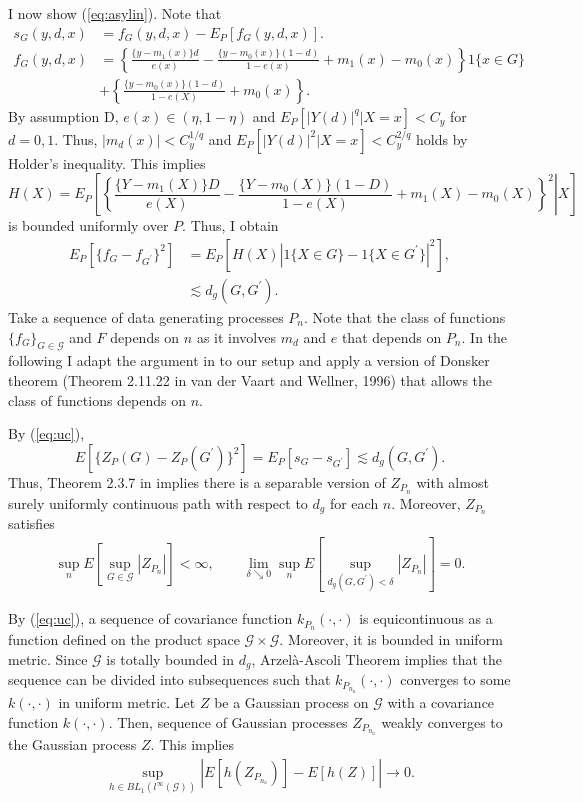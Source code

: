 \documentclass[12pt,oneside,reqno,english]{amsart}
\theoremstyle{definition}
\begin{document}
I now show (\ref{eq:asylin}). Note that 
\begin{align*}
s_{G}(y,d,x)&=f_{G}(y,d,x)-E_{P}[f_{G}(y,d,x)].\\
f_{G}(y,d,x)&=\left\{\frac{\{y-m_{1}(x)\}d}{e(x)}-\frac{\{y-m_{0}(x)\}(1-d)}{1-e(x)}+m_{1}(x)-m_{0}(x)\right\}1\{x\in G\}\\
&+\left\{\frac{\{y-m_{0}(x)\}(1-d)}{1-e(X)}+m_{0}(x)\right\}.
\end{align*}
By assumption D, $e(x)\in (\eta,1-\eta)$ and $E_{P}[|Y(d)|^{q}|X=x]<C_{y}$ for $d=0,1$. 
Thus, $|m_{d}(x)|<C_{y}^{1/q}$ and $E_{P}[|Y(d)|^{2}|X=x]<C_{y}^{2/q}$ holds by Holder's inequality. This implies  
\[H(X)=E_{P}\left[\left. \left\{\frac{\{Y-m_{1}(X)\}D}{e(X)}-\frac{\{Y-m_{0}(X)\}(1-D)}{1-e(X)}+m_{1}(X)-m_{0}(X)\right\}^{2}\right| X\right]\]
is bounded uniformly over $P$. Thus, I obtain 
\begin{align}
E_{P}[\{f_{G}-f_{G^{\prime}}\}^{2}]&=E_{P}[H(X)|1\{X\in G\}-1\{X\in G^{\prime}\}|^{2}],\nonumber\\
&\lesssim d_{g}(G,G^{\prime}).\label{eq:uc}
\end{align}
Take a sequence of data generating processes $P_{n}$. 
Note that the class of functions $\{f_{G}\}_{G\in \mathcal{G}}$ and $F$ depends on $n$ as it involves $m_{d}$ and $e$ that depends on $P_{n}$. 
In the following I adapt the argument in \cite{BCFH:17} to our setup and apply a version of Donsker theorem (Theorem 2.11.22 in van der Vaart and Wellner, 1996) that allows the class of functions depends on $n$. 

By (\ref{eq:uc}), 
\[E[\{Z_{P}(G)-Z_{P}(G^{\prime})\}^{2}]=E_{P}[s_{G}-s_{G^{\prime}}]\lesssim d_{g}(G,G^{\prime}).\]
 Thus, Theorem 2.3.7 in \cite{GN:15} implies 
 there is a separable version of $Z_{P_{n}}$ with almost surely uniformly continuous path with respect to $d_{g}$ for each $n$. 
 Moreover, $Z_{P_{n}}$ satisfies 
\begin{align*}
\sup_{n}E\left[\sup_{G\in \mathcal{G}} |Z_{P_{n}}|\right]<\infty, \qquad
\lim_{\delta\searrow 0}\sup_{n}E\left[\sup_{d_{g}(G,G^{\prime})<\delta} \left|Z_{P_{n}}\right|\right]=0.
\end{align*}


By (\ref{eq:uc}), a sequence of covariance function $k_{P_{n}}(\cdot,\cdot)$ is equicontinuous as a function defined on the product space $\mathcal{G}\times \mathcal{G}$. Moreover, it is bounded in uniform metric. Since $\mathcal{G}$ is totally bounded in $d_{g}$, Arzel\`a-Ascoli Theorem implies that the sequence can be divided into subsequences such that  $k_{P_{n_{a}}}(\cdot,\cdot)$ converges to some $k(\cdot,\cdot)$ in uniform metric. Let $Z$ be a Gaussian process on $\mathcal{G}$ with a covariance function $k(\cdot,\cdot)$.  Then, sequence of  
Gaussian processes $Z_{P_{n_{a}}}$ weakly converges to the Gaussian process $Z$.
This implies  
\begin{align*}
\sup_{h\in BL_{1}(l^{\infty}(\mathcal{G}))}\left|E[h(Z_{P_{n_{a}}})]-E[h(Z)]\right|\rightarrow 0. 
\end{align*}
\end{document}
